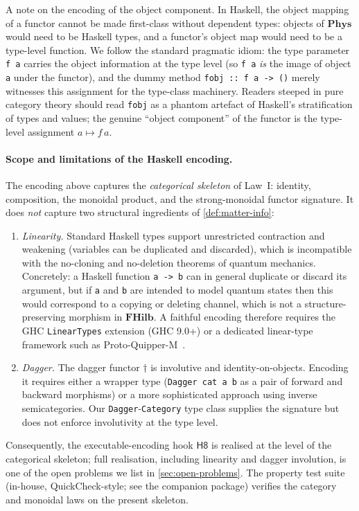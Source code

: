 \documentclass[12pt]{article}
\theoremstyle{definition}
\theoremstyle{remark}
\newcommand{\Phys}{\mathbf{Phys}}
\newcommand{\FHilb}{\mathbf{FHilb}}
\begin{document}
A note on the encoding of the object component. In Haskell, the object mapping of a functor cannot be made first-class without dependent types: objects of $\Phys$ would need to be Haskell types, and a functor's object map would need to be a type-level function. We follow the standard pragmatic idiom: the type parameter \verb|f a| carries the object information at the type level (so \verb|f a| \emph{is} the image of object \verb|a| under the functor), and the dummy method \verb|fobj :: f a -> ()| merely witnesses this assignment for the type-class machinery. Readers steeped in pure category theory should read \verb|fobj| as a phantom artefact of Haskell's stratification of types and values; the genuine ``object component'' of the functor is the type-level assignment $a \mapsto f\,a$.

\paragraph{Scope and limitations of the Haskell encoding.} The encoding above captures the \emph{categorical skeleton} of Law~I: identity, composition, the monoidal product, and the strong-monoidal functor signature. It does \emph{not} capture two structural ingredients of \cref{def:matter-info}:
\begin{enumerate}
\item \emph{Linearity.} Standard Haskell types support unrestricted contraction and weakening (variables can be duplicated and discarded), which is incompatible with the no-cloning and no-deletion theorems of quantum mechanics. Concretely: a Haskell function \texttt{a -> b} can in general duplicate or discard its argument, but if \texttt{a} and \texttt{b} are intended to model quantum states then this would correspond to a copying or deleting channel, which is not a structure-preserving morphism in $\FHilb$. A faithful encoding therefore requires the GHC \texttt{LinearTypes} extension (GHC 9.0+) or a dedicated linear-type framework such as Proto-Quipper-M~\cite{fukishidaselinger2020}.
\item \emph{Dagger.} The dagger functor $\dagger$ is involutive and identity-on-objects. Encoding it requires either a wrapper type (\verb|Dagger cat a b| as a pair of forward and backward morphisms) or a more sophisticated approach using inverse semicategories. Our \verb|Dagger|-\verb|Category| type class supplies the signature but does not enforce involutivity at the type level.
\end{enumerate}
Consequently, the executable-encoding hook $\mathsf{H8}$ is realised at the level of the categorical skeleton; full realisation, including linearity and dagger involution, is one of the open problems we list in \cref{sec:open-problems}. The property test suite (in-house, QuickCheck-style; see the companion package) verifies the category and monoidal laws on the present skeleton.
\end{document}
